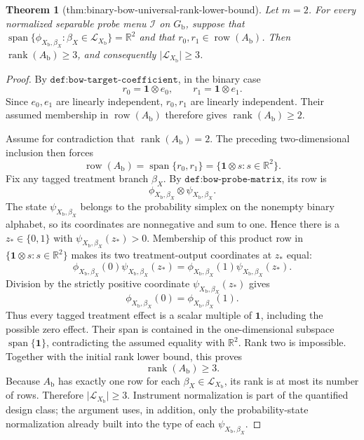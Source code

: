 \documentclass{article}
\newtheorem{theorem}{Theorem}
\begin{document}
\begin{theorem}[thm:binary-bow-universal-rank-lower-bound]\label{thm:binary-bow-universal-rank-lower-bound}
Let \(m=2\).  For every normalized separable probe menu \(\mathcal I\) on
\(G_{\mathrm b}\), suppose that
\(\operatorname{span}\{\phi_{X_{\mathrm b},\beta_X}:\beta_X\in
\mathcal L_{X_{\mathrm b}}\}=\mathbb R^2\) and that
\(r_0,r_1\in\operatorname{row}(A_{\mathrm b})\).  Then
\(\operatorname{rank}(A_{\mathrm b})\ge3\), and consequently
\(\lvert\mathcal L_{X_{\mathrm b}}\rvert\ge3\).
\end{theorem}
\begin{proof}
By \(\texttt{def:bow-target-coefficient}\), in the binary case
\[
r_0=\mathbf 1\otimes e_0,
\qquad
r_1=\mathbf 1\otimes e_1.
\]
Since \(e_0,e_1\) are linearly independent, \(r_0,r_1\) are linearly independent.  Their assumed membership in \(\operatorname{row}(A_{\mathrm b})\) therefore gives \(\operatorname{rank}(A_{\mathrm b})\ge2\).

Assume for contradiction that \(\operatorname{rank}(A_{\mathrm b})=2\).  The preceding two-dimensional inclusion then forces
\[
\operatorname{row}(A_{\mathrm b})
=\operatorname{span}\{r_0,r_1\}
=\{\mathbf 1\otimes s:s\in\mathbb R^2\}.
\]
Fix any tagged treatment branch \(\beta_X\).  By \(\texttt{def:bow-probe-matrix}\), its row is
\[
\phi_{X_{\mathrm b},\beta_X}\otimes
\psi_{X_{\mathrm b},\beta_X}.
\]
The state \(\psi_{X_{\mathrm b},\beta_X}\) belongs to the probability simplex on the nonempty binary alphabet, so its coordinates are nonnegative and sum to one.  Hence there is a \(z_*\in\{0,1\}\) with \(\psi_{X_{\mathrm b},\beta_X}(z_*)>0\).  Membership of this product row in \(\{\mathbf 1\otimes s:s\in\mathbb R^2\}\) makes its two treatment-output coordinates at \(z_*\) equal:
\[
\phi_{X_{\mathrm b},\beta_X}(0)\psi_{X_{\mathrm b},\beta_X}(z_*)
=
\phi_{X_{\mathrm b},\beta_X}(1)\psi_{X_{\mathrm b},\beta_X}(z_*).
\]
Division by the strictly positive coordinate \(\psi_{X_{\mathrm b},\beta_X}(z_*)\) gives
\[
\phi_{X_{\mathrm b},\beta_X}(0)
=\phi_{X_{\mathrm b},\beta_X}(1).
\]
Thus every tagged treatment effect is a scalar multiple of \(\mathbf 1\), including the possible zero effect.  Their span is contained in the one-dimensional subspace \(\operatorname{span}\{\mathbf 1\}\), contradicting the assumed equality with \(\mathbb R^2\).  Rank two is impossible.  Together with the initial rank lower bound, this proves
\[
\operatorname{rank}(A_{\mathrm b})\ge3.
\]
Because \(A_{\mathrm b}\) has exactly one row for each \(\beta_X\in\mathcal L_{X_{\mathrm b}}\), its rank is at most its number of rows.  Therefore \(\lvert\mathcal L_{X_{\mathrm b}}\rvert\ge3\).  Instrument normalization is part of the quantified design class; the argument uses, in addition, only the probability-state normalization already built into the type of each \(\psi_{X_{\mathrm b},\beta_X}\).
\end{proof}
\end{document}
